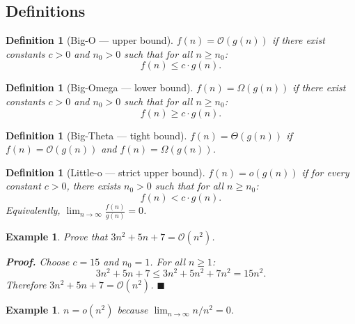 \documentclass[11pt,a4paper]{article}
\newtheorem{definition}[theorem]{Definition}
\newtheorem{example}[theorem]{Example}
\newcommand{\bigO}{\mathcal{O}}
\newcommand{\bigOmega}{\Omega}
\newcommand{\bigTheta}{\Theta}
\begin{document}
\subsection{Definitions}

\begin{definition}[Big-O --- upper bound]
$f(n) = \bigO(g(n))$ if there exist constants $c > 0$ and $n_0 > 0$ such that for all $n \geq n_0$:
\[
f(n) \leq c \cdot g(n).
\]
\end{definition}

\begin{definition}[Big-Omega --- lower bound]
$f(n) = \bigOmega(g(n))$ if there exist constants $c > 0$ and $n_0 > 0$ such that for all $n \geq n_0$:
\[
f(n) \geq c \cdot g(n).
\]
\end{definition}

\begin{definition}[Big-Theta --- tight bound]
$f(n) = \bigTheta(g(n))$ if $f(n) = \bigO(g(n))$ and $f(n) = \bigOmega(g(n))$.
\end{definition}

\begin{definition}[Little-o --- strict upper bound]
$f(n) = o(g(n))$ if for every constant $c > 0$, there exists $n_0 > 0$ such that for all $n \geq n_0$:
\[
f(n) < c \cdot g(n).
\]
Equivalently, $\lim_{n \to \infty} \frac{f(n)}{g(n)} = 0$.
\end{definition}

\begin{example}
Prove that $3n^2 + 5n + 7 = \bigO(n^2)$.

\textbf{Proof.} Choose $c = 15$ and $n_0 = 1$. For all $n \geq 1$:
\[
3n^2 + 5n + 7 \leq 3n^2 + 5n^2 + 7n^2 = 15n^2.
\]
Therefore $3n^2 + 5n + 7 = \bigO(n^2)$. \hfill $\blacksquare$
\end{example}

\begin{example}
$n = o(n^2)$ because $\lim_{n \to \infty} n/n^2 = 0$.
\end{example}
\end{document}
